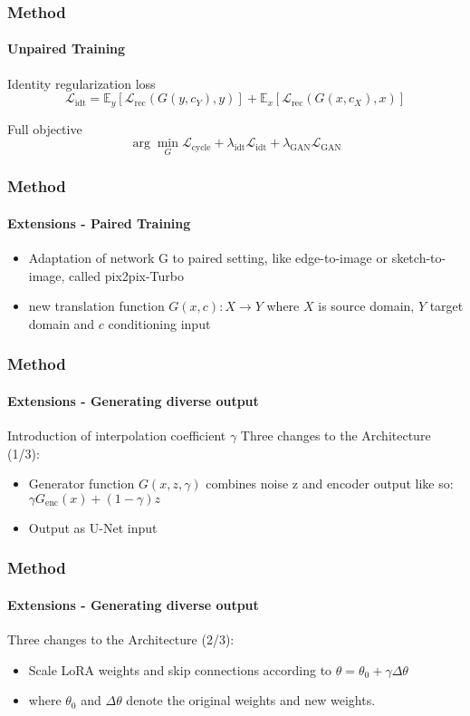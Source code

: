 \documentclass[aspectratio=169, lecture, amberg]{OTHAWbeamer}
\begin{document}
\begin{frame}
\frametitle{Method}
\framesubtitle{Unpaired Training}
\begin{block}{Identity regularization loss}
    \begin{equation}
        \mathcal{L} _{\text{idt}} = \mathbb{E} _y [ \mathcal{L}_{\text{rec}}(G(y,c_Y),y)] + \mathbb{E}_x [ \mathcal{L}_{\text{rec}}(G(x,c_X),x)]
    \end{equation}
\end{block}

\begin{block}{Full objective}
    \begin{equation}
       \arg \underset{G}{\min} \mathcal{L}_{\text{cycle}} + \lambda _{\text{idt}} \mathcal{L}_{\text{idt}} + \lambda_{\text{GAN}}\mathcal{L}_{\text{GAN}}
    \end{equation}
\end{block}
    

\end{frame}


\begin{frame}
\frametitle{Method}
\framesubtitle{Extensions - Paired Training}
\begin{itemize}
    \item Adaptation of network G to paired setting, like edge-to-image or sketch-to-image, called pix2pix-Turbo
    \item new translation function $G(x,c): X \rightarrow Y$ where $X$ is source domain, $Y$ target domain and $c$ conditioning input
\end{itemize}
\end{frame}

\begin{frame}
    \frametitle{Method}
    \framesubtitle{Extensions - Generating diverse output}
    Introduction of interpolation coefficient $\gamma$ \newline 
    Three changes to the Architecture (1/3):
    \begin {itemize}
        \item Generator function $G(x,z,\gamma)$ combines noise z and encoder output like so: $\gamma G_{\text{enc}}(x) + (1 - \gamma) z$
        \item Output as U-Net input
    \end{itemize}
\end{frame}

\begin{frame}
    \frametitle{Method}
    \framesubtitle{Extensions - Generating diverse output}
    Three changes to the Architecture (2/3):
    \begin {itemize}
        \item Scale LoRA weights and skip connections according to $\theta = \theta_0 + \gamma \Delta \theta$  
        \item where $\theta_0$ and $\Delta \theta$ denote the original weights and new weights.
    \end{itemize}
\end{frame}
\end{document}
